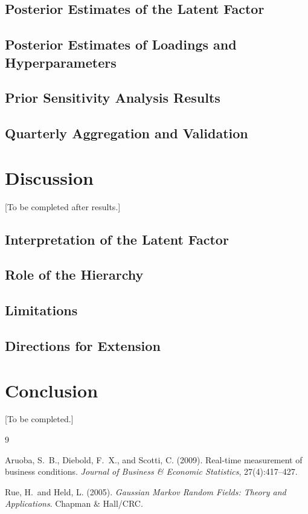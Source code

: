 \documentclass[11pt]{article}
\begin{document}
\subsection{Posterior Estimates of the Latent Factor}

\subsection{Posterior Estimates of Loadings and Hyperparameters}

\subsection{Prior Sensitivity Analysis Results}

\subsection{Quarterly Aggregation and Validation}

\section{Discussion}
[To be completed after results.]

\subsection{Interpretation of the Latent Factor}

\subsection{Role of the Hierarchy}

\subsection{Limitations}

\subsection{Directions for Extension}

\section{Conclusion}
[To be completed.]


\begin{thebibliography}{9}

Aruoba, S.~B., Diebold, F.~X., and Scotti, C. (2009).
\newblock Real-time measurement of business conditions.
\newblock \emph{Journal of Business \& Economic Statistics}, 27(4):417--427.

Rue, H.\ and Held, L. (2005).
\newblock \emph{Gaussian Markov Random Fields: Theory and Applications}.
\newblock Chapman \& Hall/CRC.

\end{thebibliography}
\end{document}
